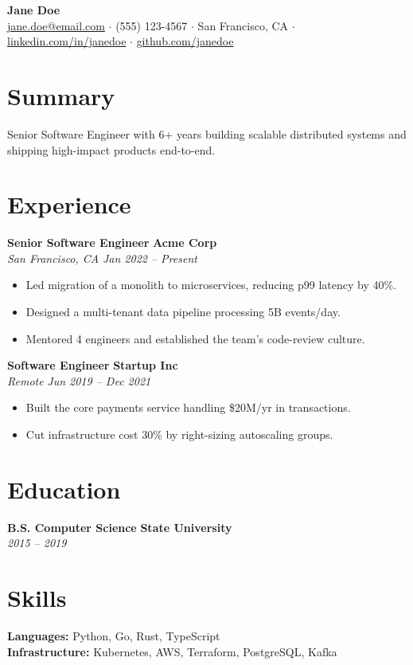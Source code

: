 \documentclass[11pt,letterpaper]{article}
\begin{document}
\begin{center}
  {\Huge \textbf{Jane Doe}}\\[3pt]
  \small
  \href{mailto:jane.doe@email.com}{jane.doe@email.com} $\cdot$
  (555) 123-4567 $\cdot$
  San Francisco, CA $\cdot$
  \href{https://linkedin.com/in/janedoe}{linkedin.com/in/janedoe} $\cdot$
  \href{https://github.com/janedoe}{github.com/janedoe}
\end{center}

\section*{Summary}
Senior Software Engineer with 6+ years building scalable distributed systems
and shipping high-impact products end-to-end.

\section*{Experience}
\textbf{Senior Software Engineer} \hfill \textbf{Acme Corp} \\
\textit{San Francisco, CA} \hfill \textit{Jan 2022 -- Present}
\begin{itemize}
  \item Led migration of a monolith to microservices, reducing p99 latency by 40\%.
  \item Designed a multi-tenant data pipeline processing 5B events/day.
  \item Mentored 4 engineers and established the team's code-review culture.
\end{itemize}
\vspace{4pt}
\textbf{Software Engineer} \hfill \textbf{Startup Inc} \\
\textit{Remote} \hfill \textit{Jun 2019 -- Dec 2021}
\begin{itemize}
  \item Built the core payments service handling \$20M/yr in transactions.
  \item Cut infrastructure cost 30\% by right-sizing autoscaling groups.
\end{itemize}

\section*{Education}
\textbf{B.S. Computer Science} \hfill \textbf{State University} \\
\textit{2015 -- 2019}

\section*{Skills}
\textbf{Languages:} Python, Go, Rust, TypeScript \\
\textbf{Infrastructure:} Kubernetes, AWS, Terraform, PostgreSQL, Kafka
\end{document}
